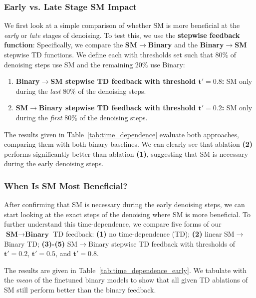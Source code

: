 \documentclass{article}
\begin{document}
\subsubsection{Early vs. Late Stage SM Impact}

We first look at a simple comparison of whether SM is more beneficial at the \textit{early} or \textit{late} stages of denoising.
%
To test this, we use the \textbf{stepwise feedback function}:
%
Specifically, we compare the \textbf{SM$\rightarrow$Binary} and the \textbf{Binary$\rightarrow$SM} stepwise TD functions. 
%
We define each with thresholds set such that $80\%$ of denoising steps use SM and the remaining $20\%$ use Binary:
\begin{enumerate}
    \item \textbf{Binary$\rightarrow$SM stepwise TD feedback with threshold $\mathbf{t'=0.8}$:} SM only during the \textit{last} $80\%$ of the denoising steps.
    
    \item \textbf{SM$\rightarrow$Binary stepwise TD feedback with threshold $\mathbf{t'=0.2}$:} SM only during the \textit{first} $80\%$ of the denoising steps.
\end{enumerate}

The results given in Table~\ref{tab:time_dependence} evaluate both approaches, comparing them with both binary baselines. %
%
We can clearly see that ablation \textbf{(2)} performs significantly better than ablation \textbf{(1)}, suggesting that SM is necessary during the early denoising steps.



\subsubsection{When Is SM Most Beneficial?}

After confirming that SM is necessary during the early denoising steps, we can start looking at the exact steps of the denoising where SM is more beneficial.
%
To further understand this time-dependence, we compare five forms of our $\textbf{SM$\rightarrow$Binary}$ TD feedback: 
%
\textbf{(1)} no time-dependence (TD); 
%
\textbf{(2)} linear SM$\rightarrow$Binary TD; 
%
\textbf{(3)-(5)} SM$\rightarrow$Binary stepwise TD feedback with thresholds of $\mathbf{t'=0.2}$, $\mathbf{t'=0.5}$, and $\mathbf{t'=0.8}$.

The results are given in Table~\ref{tab:time_dependence_early}.
%
We tabulate with the \textit{mean} of the finetuned binary models to show that all given TD ablations of SM still perform better than the binary feedback.
\end{document}
